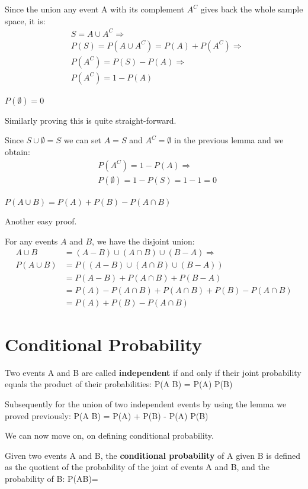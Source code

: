 \bq
Since the union any event A with its complement $A^C$ gives back the whole sample space, it is:
\begin{align*}
& S = A \cup A^{C} \Rightarrow \\
& P(S) = P(A \cup A^{C}) = P(A) + P(A^{C}) \Rightarrow \\
& P(A^{C}) = P(S) - P(A) \Rightarrow \\
& P(A^{C}) = 1 - P(A)
\end{align*}
\eq

\bt[]
$P(\emptyset) = 0$
\et

Similarly proving this is quite straight-forward.

\bq
Since $S \cup \emptyset = S$ we can set $A = S$ and $A^{C} = \emptyset$ in the previous lemma and we obtain:
\begin{align*}
& P(A^{C}) = 1 - P(A) \Rightarrow \\ & P(\emptyset) = 1 - P(S) = 1 - 1 = 0
\end{align*}
\eq

\bt[]
$P(A \cup B) = P(A) + P(B) - P(A \cap B)$
\et

Another easy proof.

\bq
For any events $A$ and $B$, we have the disjoint union:
\begin{align*}
A \cup B &= (A-B) \cup (A \cap B) \cup (B-A) \Rightarrow \\
P(A \cup B) &= P((A-B) \cup (A \cap B) \cup (B-A)) \\
&= P(A - B) + P(A \cap B) + P(B - A) \\
&= P(A) - P(A \cap B) + P(A \cap B) + P(B)- P(A \cap B) \\
&= P(A) + P(B) - P(A \cap B)
\end{align*}
\eq

\section{Conditional Probability}

Two events A and B are called \textbf{independent} if and only if their joint probability equals the product of their
probabilities:
\bse
P(A \cap B) = P(A) P(B)
\ese
\ed

Subsequently for the union of two independent events by using the lemma we proved previously:
\bse
P(A \cup B) = P(A) + P(B) - P(A) P(B)
\ese

We can now move on, on defining conditional probability.

Given two events A and B, the \textbf{conditional probability} of A given B is defined as the quotient of the
probability of the joint of events A and B, and the probability of B:
\bse
P(A\mid B)={}
\ese
\ed

